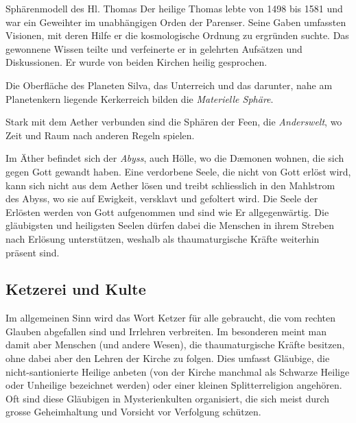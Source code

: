 \documentclass[10pt,twoside,twocolumn,openany]{book}
\begin{document}
	


	\begin{paperbox}{Sphärenmodell des Hl. Thomas}
		Der heilige Thomas lebte von 1498 bis 1581 und war ein Geweihter im unabhängigen Orden der Parenser. Seine Gaben umfassten Visionen, mit deren Hilfe er die kosmologische Ordnung zu ergründen suchte. Das gewonnene Wissen teilte und verfeinerte er in gelehrten Aufsätzen und Diskussionen. Er wurde von beiden Kirchen heilig gesprochen.
		
		Die Oberfläche des Planeten Silva, das Unterreich und das darunter, nahe am Planetenkern liegende Kerkerreich bilden die \emph{Materielle Sphäre}.
		
		Stark mit dem Aether verbunden sind die Sphären der Feen, die \emph{Anderswelt}, wo Zeit und Raum nach anderen Regeln spielen.
		
		Im Äther befindet sich der \emph{Abyss}, auch Hölle, wo die D\ae monen wohnen, die sich gegen Gott gewandt haben. Eine verdorbene Seele, die nicht von Gott erlöst wird, kann sich nicht aus dem Aether lösen und treibt schliesslich in den Mahlstrom des Abyss, wo sie auf Ewigkeit, versklavt und gefoltert wird.
		Die Seele der Erlösten werden von Gott aufgenommen und sind wie Er allgegenwärtig. Die gläubigsten und heiligsten Seelen dürfen dabei die Menschen in ihrem Streben nach Erlösung unterstützen, weshalb als thaumaturgische Kräfte weiterhin präsent sind.
	\end{paperbox}

	\subsection{Ketzerei und Kulte}

	Im allgemeinen Sinn wird das Wort Ketzer für alle gebraucht, die vom rechten Glauben abgefallen sind und Irrlehren verbreiten. Im besonderen meint man damit aber Menschen (und andere Wesen), die thaumaturgische Kräfte besitzen, ohne dabei aber den Lehren der Kirche zu folgen. Dies umfasst Gläubige, die nicht-santionierte Heilige anbeten (von der Kirche manchmal als Schwarze Heilige oder Unheilige bezeichnet werden) oder einer kleinen Splitterreligion angehören. Oft sind diese Gläubigen in Mysterienkulten organisiert, die sich meist durch grosse Geheimhaltung und Vorsicht vor Verfolgung schützen.
	
\end{document}
